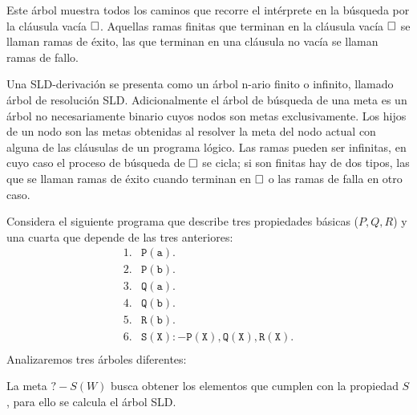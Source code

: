 \documentclass[11pt,letterpaper]{article}
\begin{document}

Este \'arbol muestra todos los caminos que recorre el int\'erprete en la 
b\'usqueda por la cl\'ausula vac\'ia $\square$. Aquellas ramas finitas que terminan 
en la cl\'ausula vac\'ia $\square$ se llaman ramas de \'exito, las que terminan en 
una cl\'ausula no vac\'ia se llaman ramas de fallo. 

\medskip

Una SLD-derivaci\'on se presenta como un \'arbol n-ario finito o infinito,
llamado \'arbol de resoluci\'on SLD. 
Adicionalmente el \'arbol de b\'usqueda de una meta es un \'arbol no 
necesariamente binario cuyos nodos son metas exclusivamente. Los hijos de un 
nodo son las metas obtenidas al resolver la meta del nodo actual con alguna de
las cl\'ausulas de un programa l\'ogico. Las ramas pueden ser
infinitas, en cuyo caso el proceso de b\'usqueda de $\square$ se cicla; si son 
finitas hay de dos tipos, las que se llaman ramas de \'exito cuando terminan 
en $\square$ o las ramas de falla en otro caso.



\beje
Considera el siguiente programa que describe tres propiedades b\'asicas 
($P,Q,R$) y una cuarta que depende de las tres anteriores:
\[
 \begin{array}{rl}
  1. & \mathtt{P(a).} \\
  2. & \mathtt{P(b).} \\
  3. & \mathtt{Q(a).} \\ 
  4. & \mathtt{Q(b).} \\
  5. & \mathtt{R(b).} \\
  6. & \mathtt{S(X):- P(X),Q(X),R(X).} \\
 \end{array}
\]
Analizaremos tres \'arboles diferentes:
\bi
\item La meta $?-S(W)$ busca obtener los elementos que cumplen con la propiedad 
$S$, para ello se calcula el \'arbol SLD. 
\end{document}

